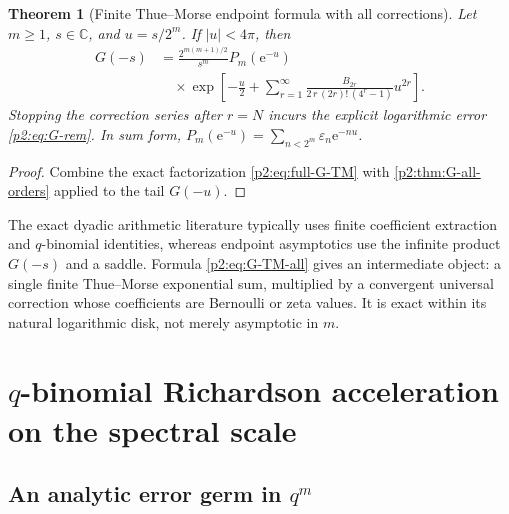 \documentclass[11pt,oneside]{article}
\numberwithin{equation}{section}
\newtheorem{theorem}{Theorem}[section]
\theoremstyle{definition}
\theoremstyle{remark}
\newcommand{\C}{\mathbb C}
\newcommand{\e}{\mathrm e}
\newcommand{\eps}{\varepsilon}
\begin{document}
\begin{theorem}[Finite Thue--Morse endpoint formula with all corrections]
\label{p2:thm:G-TM-all}
Let $m\ge1$, $s\in\C$, and $u=s/2^m$.  If $|u|<4\pi$, then
\begin{equation}
 \boxed{
 \begin{aligned}
 G(-s)
 &=\frac{2^{m(m+1)/2}}{s^m}P_m(\e^{-u})\\
 &\quad\times
 \exp\!\left[-\frac{u}{2}
 +\sum_{r=1}^{\infty}
 \frac{B_{2r}}{2\,r\,(2r)!\,(4^r-1)}u^{2r}\right].
 \end{aligned}}
 \label{p2:eq:G-TM-all}
\end{equation}
Stopping the correction series after $r=N$ incurs the explicit logarithmic error
\eqref{p2:eq:G-rem}.  In sum form, $P_m(\e^{-u})=\sum_{n<2^m}\eps_n\e^{-nu}$.
\newresult
\end{theorem}

\begin{proof}
Combine the exact factorization \eqref{p2:eq:full-G-TM} with
\cref{p2:thm:G-all-orders} applied to the tail $G(-u)$.
\end{proof}

\begin{remark}
The exact dyadic arithmetic literature typically uses finite coefficient extraction and
$q$-binomial identities, whereas endpoint asymptotics use the infinite product $G(-s)$ and a
saddle.  Formula \eqref{p2:eq:G-TM-all} gives an intermediate object: a single finite
Thue--Morse exponential sum, multiplied by a convergent universal correction whose
coefficients are Bernoulli or zeta values.  It is exact within its natural logarithmic disk,
not merely asymptotic in $m$.
\end{remark}

\section{$q$-binomial Richardson acceleration on the spectral scale}
\label{p2:sec:richardson}

\subsection{An analytic error germ in $q^m$}
\end{document}
